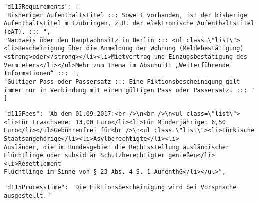 \begin{verbatim}
"d115Requirements": [
"Bisheriger Aufenthaltstitel ::: Soweit vorhanden, ist der bisherige Aufenthaltstitel mitzubringen, z.B. der elektronische Aufenthaltstitel (eAT). ::: ",
"Nachweis über den Hauptwohnsitz in Berlin ::: <ul class=\"list\"><li>Bescheinigung über die Anmeldung der Wohnung (Meldebestätigung) <strong>oder</strong></li><li>Mietvertrag und Einzugsbestätigung des Vermieters</li></ul>Mehr zum Thema im Abschnitt „Weiterführende Informationen“ ::: ",
"Gültiger Pass oder Passersatz ::: Eine Fiktionsbescheinigung gilt immer nur in Verbindung mit einem gültigen Pass oder Passersatz. ::: "
]
\end{verbatim}


\begin{verbatim}
"d115Fees": "Ab dem 01.09.2017:<br />\n<br />\n<ul class=\"list\"><li>Für Erwachsene: 13,00 Euro</li><li>Für Minderjährige: 6,50 Euro</li></ul>Gebührenfrei für<br />\n<ul class=\"list\"><li>Türkische Staatsangehörige</li><li>Asylberechtigte</li><li>
Ausländer, die im Bundesgebiet die Rechtsstellung ausländischer Flüchtlinge oder subsidiär Schutzberechtigter genießen</li><li>Resettlement-
Flüchtlinge im Sinne von § 23 Abs. 4 S. 1 AufenthG</li></ul>",
\end{verbatim}

\begin{verbatim}
"d115ProcessTime": "Die Fiktionsbescheinigung wird bei Vorsprache ausgestellt."
\end{verbatim}

